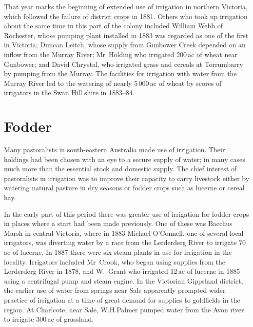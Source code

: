 That year marks the beginning of extended use of irrigation in
northern Victoria, which followed the failure of district crops in
1881.  Others who took up
irrigation about the same time in this part of the colony included
William Webb of Rochester, whose pumping plant installed in 1883 was
regarded as one of the first in Victoria; Duncan Leitch, whose supply
from Gunbower Creek depended on an inflow from the Murray River;
Mr~Holding who irrigated 200\,ac of wheat near Gunbower; and David
Chrystal, who irrigated grass and cereals at Torrumbarry by pumping
from the Murray.  The facilities for irrigation
with water from the Murray River led to the watering of nearly
5\,000\,ac of wheat by scores of irrigators in the Swan Hill shire in
1883--84.

\section*{Fodder}

Many pastoralists in south-eastern Australia made use of irrigation.
Their holdings had been chosen with an eye to a secure supply of
water; in many cases much more than the essential stock and domestic
supply.  The chief interest of pastoralists in irrigation was to
improve their capacity to carry livestock either by watering natural
pasture in dry seasons or fodder crops such as lucerne or cereal hay.

In the early part of this period there was greater use of irrigation
for fodder crops in places where a start had been made previously.
One of these was Bacchus Marsh in central Victoria, where in 1883
Michael O'Connell, one of several local irrigators, was diverting
water by a race from the Lerderderg River to irrigate 70\,ac of
lucerne.  In 1887 there
were six steam plants in use for irrigation in the
locality.  Irrigators included
Mr~Crook, who began using supplies from the Lerderderg River in 1878,
and W.~Grant who irrigated 12\,ac of lucerne in 1885 using a
centrifugal pump and steam engine.  In the Victorian Gippsland district, the earlier use of
water from springs near Sale apparently prompted wider practice of
irrigation at a time of great demand for supplies to goldfields in the
region.  At Charlcote, near Sale, W.H.Palmer pumped
water from the Avon river to irrigate 300\,ac of
grassland.


